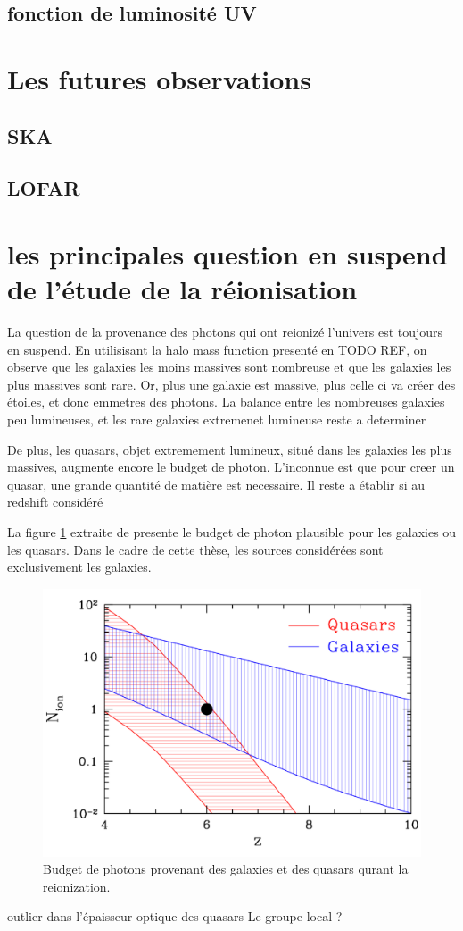 \subsection{fonction de luminosité UV}


\section{Les futures observations}
\subsection{SKA}
\subsection{LOFAR}





\section{les principales question en suspend de l'étude de la réionisation}


La question de la provenance des photons qui ont reionizé l'univers est toujours en suspend.
En utilisisant la halo mass function presenté en TODO REF, on observe que les galaxies les moins massives sont nombreuse et que les galaxies les plus massives sont rare.
Or, plus une galaxie est massive, plus celle ci va créer des étoiles, et donc emmetres des photons.
La balance entre les nombreuses galaxies peu lumineuses, et les rare galaxies extremenet lumineuse reste a determiner

De plus, les quasars, objet extremement lumineux, situé dans les galaxies les plus massives, augmente encore le budget de photon.
L'inconnue est que pour creer un quasar, une grande quantité de matière est necessaire.
Il reste a établir si au redshift considéré
\cite{chardin_large-scale_2017}


La figure \ref{fig:gal_AGN} extraite de \cite{trac_computer_2011} presente le budget de photon plausible pour les galaxies ou les quasars.
Dans le cadre de cette thèse, les sources considérées sont exclusivement les galaxies.

\begin{figure}[bth]
        \includegraphics[width=.95\linewidth]{img/01/gal_AGN.pdf} 
        \caption{
        Budget de photons provenant des galaxies et des quasars qurant la reionization.
}
 		\label{fig:gal_AGN}
\end{figure}

outlier dans l'épaisseur optique des quasars
Le groupe local ?
